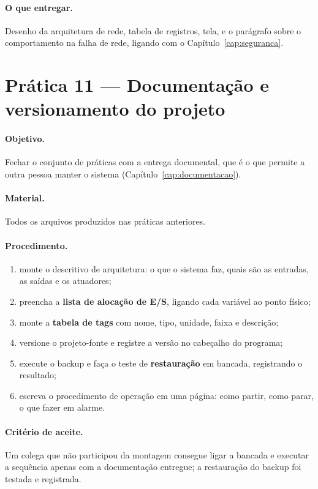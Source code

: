 \paragraph{O que entregar.} Desenho da arquitetura de rede, tabela de registros, tela, e o parágrafo
sobre o comportamento na falha de rede, ligando com o Capítulo~\ref{cap:seguranca}.

\section{Prática 11 --- Documentação e versionamento do projeto}

\paragraph{Objetivo.} Fechar o conjunto de práticas com a entrega documental, que é o que permite a
outra pessoa manter o sistema (Capítulo~\ref{cap:documentacao}).

\paragraph{Material.} Todos os arquivos produzidos nas práticas anteriores.

\paragraph{Procedimento.}
\begin{enumerate}
  \item monte o descritivo de arquitetura: o que o sistema faz, quais são as entradas, as saídas e os
        atuadores;
  \item preencha a \textbf{lista de alocação de E/S}, ligando cada variável ao ponto físico;
  \item monte a \textbf{tabela de tags} com nome, tipo, unidade, faixa e descrição;
  \item versione o projeto-fonte e registre a versão no cabeçalho do programa;
  \item execute o backup e faça o teste de \textbf{restauração} em bancada, registrando o resultado;
  \item escreva o procedimento de operação em uma página: como partir, como parar, o que fazer em
        alarme.
\end{enumerate}

\paragraph{Critério de aceite.} Um colega que não participou da montagem consegue ligar a bancada e
executar a sequência apenas com a documentação entregue; a restauração do backup foi testada e
registrada.

